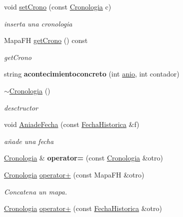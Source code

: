 \begin{DoxyCompactItemize}
void \hyperlink{classCronologia_ab543199019ac2916b86d510d429f5e4a}{set\+Crono} (const \hyperlink{classCronologia}{Cronologia} c)
\begin{DoxyCompactList}\small\item\em inserta una cronologia \end{DoxyCompactList}\item 
Mapa\+FH \hyperlink{classCronologia_a5ca66a485a589fc136466c6550514d51}{get\+Crono} () const
\begin{DoxyCompactList}\small\item\em get\+Crono \end{DoxyCompactList}\item 
\mbox{\label{classCronologia_ad93a41a97cc1c9a15aad44d7ed7ca2d7}} 
string {\bfseries acontecimientoconcreto} (int \hyperlink{classCronologia_a5412d39f8e20dd2a178eaed3a2c660fc}{anio}, int contador)
\item 
\mbox{\label{classCronologia_a7e995892e46a00b54d70a905e2bdbc53}} 
\hyperlink{classCronologia_a7e995892e46a00b54d70a905e2bdbc53}{$\sim$\+Cronologia} ()
\begin{DoxyCompactList}\small\item\em desctructor \end{DoxyCompactList}\item 
void \hyperlink{classCronologia_ab6b38ffe6f9e9f221293f365d0208294}{Aniade\+Fecha} (const \hyperlink{classFechaHistorica}{Fecha\+Historica} \&f)
\begin{DoxyCompactList}\small\item\em añade una fecha \end{DoxyCompactList}\item 
\mbox{\label{classCronologia_a8260bb6d3a895d32e2f3342c9ae48240}} 
\hyperlink{classCronologia}{Cronologia} \& {\bfseries operator=} (const \hyperlink{classCronologia}{Cronologia} \&otro)
\item 
\hyperlink{classCronologia}{Cronologia} \hyperlink{classCronologia_a5113eae269dbf9bdbb3637142b02d267}{operator+} (const Mapa\+FH \&otro)
\begin{DoxyCompactList}\small\item\em Concatena un mapa. \end{DoxyCompactList}\item 
\hyperlink{classCronologia}{Cronologia} \hyperlink{classCronologia_ab17768986b01369038b5b3852ad21fef}{operator+} (const \hyperlink{classFechaHistorica}{Fecha\+Historica} \&otro)

\end{DoxyCompactItemize}
